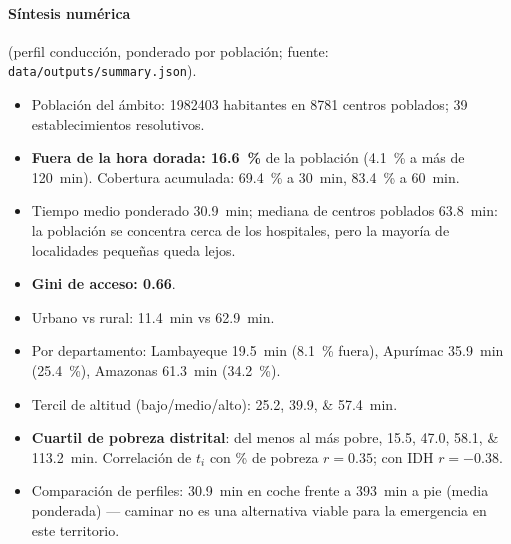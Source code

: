 \documentclass[11pt,a4paper]{article}
\begin{document}
\paragraph{S\'intesis num\'erica} (perfil conducci\'on, ponderado por poblaci\'on;
fuente: \texttt{data/outputs/summary.json}).
\begin{itemize}
  \item Poblaci\'on del \'ambito: \num{1982403} habitantes en \num{8781} centros
        poblados; \num{39} establecimientos resolutivos.
  \item \textbf{Fuera de la hora dorada: \SI{16.6}{\percent}} de la poblaci\'on
        (\SI{4.1}{\percent} a m\'as de \num{120}~min). Cobertura acumulada:
        \SI{69.4}{\percent} a \num{30}~min, \SI{83.4}{\percent} a \num{60}~min.
  \item Tiempo medio ponderado \num{30.9}~min; mediana de centros poblados
        \num{63.8}~min: la poblaci\'on se concentra cerca de los hospitales,
        pero la mayor\'ia de localidades peque\~nas queda lejos.
  \item \textbf{Gini de acceso: \num{0.66}}.
  \item Urbano vs rural: \num{11.4}~min vs \num{62.9}~min.
  \item Por departamento: Lambayeque \num{19.5}~min (\SI{8.1}{\percent} fuera),
        Apur\'imac \num{35.9}~min (\SI{25.4}{\percent}), Amazonas
        \num{61.3}~min (\SI{34.2}{\percent}).
  \item Tercil de altitud (bajo/medio/alto): \numlist{25.2;39.9;57.4}~min.
  \item \textbf{Cuartil de pobreza distrital}: del menos al m\'as pobre,
        \numlist{15.5;47.0;58.1;113.2}~min. Correlaci\'on de $t_i$ con \% de
        pobreza $r=\num{0.35}$; con IDH $r=\num{-0.38}$.
  \item Comparaci\'on de perfiles: \num{30.9}~min en coche frente a
        \num{393}~min a pie (media ponderada) --- caminar no es una alternativa
        viable para la emergencia en este territorio.
\end{itemize}
\end{document}
